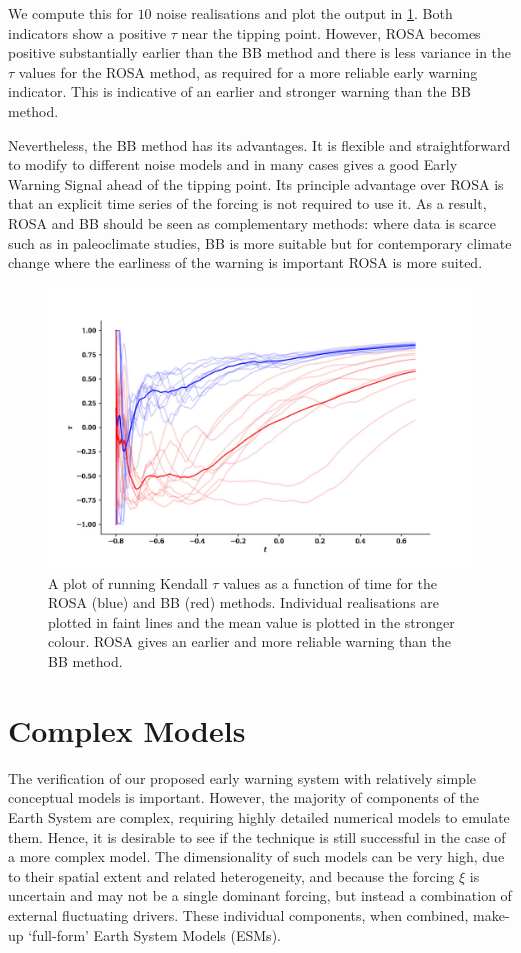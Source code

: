 We compute this for $10$ noise realisations and plot the output 
in \cref{fig:boers_method}. Both indicators show a positive 
$\tau$ near the tipping point. However, ROSA becomes positive substantially earlier than the BB method and there is
less variance in the $\tau$ values for the ROSA method, as required for a more reliable early warning indicator.
This is indicative of an earlier and stronger warning than the BB method. 

Nevertheless, the BB method has its advantages.
It is flexible and straightforward to modify to different noise
models and in many cases gives a good Early Warning Signal 
ahead of the tipping point. Its principle advantage
over ROSA is that an explicit time series of the forcing is not required to use it. As a result, ROSA and BB should be seen as complementary methods: 
where data is scarce such as in paleoclimate studies, BB is more suitable but 
for contemporary climate change where the earliness of the warning is 
important ROSA is more suited.

\begin{figure}
\includegraphics[width=\textwidth,keepaspectratio]{figure3}
\caption[A comparison of ROSA and BB]{A plot of running Kendall $\tau$ values as a function of time for the ROSA (blue) and BB (red) methods.
  Individual realisations are plotted in faint lines and the mean value is plotted in the stronger colour. ROSA gives an earlier and more reliable warning than the BB 
method.}\label{fig:boers_method}
\end{figure}

\section{Complex Models}
The verification of our proposed early warning system with relatively simple conceptual models is important.
However, the majority of components of the Earth System are complex, requiring highly detailed numerical models to emulate them. Hence, it is 
desirable to see if the technique is still successful in the case of
a more complex model. The dimensionality of such models can be very high, due to their spatial extent and related heterogeneity, and 
because the forcing $\xi$ is uncertain and may not be a single dominant forcing,  but instead a combination of external fluctuating drivers.
These individual components, when combined, make-up `full-form' Earth System Models (ESMs).

